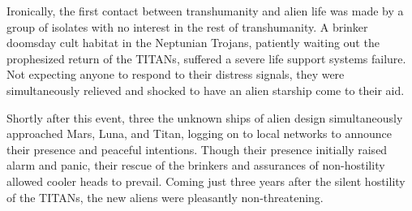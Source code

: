 Ironically, the first contact between transhumanity and alien life was
made by a group of isolates with no interest in the rest of
transhumanity. A brinker doomsday cult habitat in the Neptunian
Trojans, patiently waiting out the prophesized return of the TITANs,
suffered a severe life support systems failure.  Not expecting anyone
to respond to their distress signals, they were simultaneously
relieved and shocked to have an alien starship come to their aid.

Shortly after this event, three the unknown ships of alien design
simultaneously approached Mars, Luna, and Titan, logging on to local
networks to announce their presence and peaceful intentions.  Though
their presence initially raised alarm and panic, their rescue of the
brinkers and assurances of non-hostility allowed cooler heads to
prevail. Coming just three years after the silent hostility of the
TITANs, the new aliens were pleasantly non-threatening.

